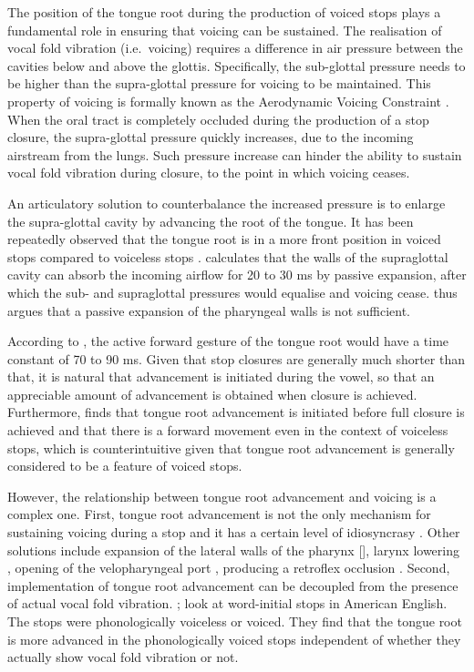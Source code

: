 \documentclass[preprint]{JASAnew}
\begin{document}
The position of the tongue root during the production of voiced stops
plays a fundamental role in ensuring that voicing can be sustained. The
realisation of vocal fold vibration (i.e.~voicing) requires a difference
in air pressure between the cavities below and above the glottis.
Specifically, the sub-glottal pressure needs to be higher than the
supra-glottal pressure for voicing to be maintained. This property of
voicing is formally known as the Aerodynamic Voicing Constraint
\citep{ohala2011}. When the oral tract is completely occluded during the
production of a stop closure, the supra-glottal pressure quickly
increases, due to the incoming airstream from the lungs. Such pressure
increase can hinder the ability to sustain vocal fold vibration during
closure, to the point in which voicing ceases.

An articulatory solution to counterbalance the increased pressure is to
enlarge the supra-glottal cavity by advancing the root of the tongue. It
has been repeatedly observed that the tongue root is in a more front
position in voiced stops compared to voiceless stops
\citep{kent1969, perkell1969, westbury1983}. \citet{rothenberg1967}
calculates that the walls of the supraglottal cavity can absorb the
incoming airflow for 20 to 30 ms by passive expansion, after which the
sub- and supraglottal pressures would equalise and voicing cease.
\citet{rothenberg1967} thus argues that a passive expansion of the
pharyngeal walls is not sufficient.

According to \citet{rothenberg1967}, the active forward gesture of the
tongue root would have a time constant of 70 to 90 ms. Given that stop
closures are generally much shorter than that, it is natural that
advancement is initiated during the vowel, so that an appreciable amount
of advancement is obtained when closure is achieved. Furthermore,
\citet{westbury1983} finds that tongue root advancement is initiated
before full closure is achieved and that there is a forward movement
even in the context of voiceless stops, which is counterintuitive given
that tongue root advancement is generally considered to be a feature of
voiced stops.

However, the relationship between tongue root advancement and voicing is
a complex one. First, tongue root advancement is not the only mechanism
for sustaining voicing during a stop
\citep{rothenberg1967, westbury1983, ohala2011} and it has a certain
level of idiosyncrasy \citep{ahn2016}. Other solutions include expansion
of the lateral walls of the pharynx {[}{]}, larynx lowering
\citep{riordan1980}, opening of the velopharyngeal port
\citep{yanagihara1966}, producing a retroflex occlusion
\citep{sprouse2008}. Second, implementation of tongue root advancement
can be decoupled from the presence of actual vocal fold vibration.
\citet{ahn2015}; \citet{ahn2016} look at word-initial stops in American
English. The stops were phonologically voiceless or voiced. They find
that the tongue root is more advanced in the phonologically voiced stops
independent of whether they actually show vocal fold vibration or not.
\end{document}
